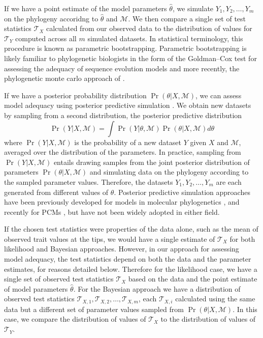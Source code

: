 \documentclass[a4paper,11pt]{article}
\begin{document}
If we have a point estimate of the model parameters $\hat{\theta}$, we simulate $Y_1, Y_2, \ldots, Y_m$ on the phylogeny accoridng to $\hat{\theta}$ and $\mathcal{M}$. We then compare a single set of test statistics $\mathcal{T}_X$ calculated from our observed data to the distribution of values for $\mathcal{T}_Y$ computed across all $m$ simulated datasets. In statistical terminology, this procedure is known as parametric bootstrapping. Parametric bootstrapping is likely familiar to phylogenetic biologists in the form of the Goldman--Cox test \citep{Goldman} for assessing the adequacy of sequence evolution models and more recently, the phylogenetic monte carlo approach of \citet{Boettiger2012}.

If we have a posterior probability distribution $\Pr(\theta|X, \mathcal{M})$, we can assess model adequacy using posterior predictive simulation \citep{Rubin1984, Gelman1996}. We obtain new datasets by sampling from a second distribution, the posterior predictive distribution
\begin{equation}
\Pr(Y|X,\mathcal{M}) = \int \Pr(Y|\theta, \mathcal{M})\Pr(\theta |X,\mathcal{M})d\theta
\end{equation}
where $\Pr(Y|X,\mathcal{M})$ is the probability of a new dataset $Y$ given $X$ and $\mathcal{M}$, averaged over the distribution of the parameters. In practice, sampling from $\Pr(Y|X,\mathcal{M})$ entails drawing samples from the joint posterior distribution of parameters $\Pr(\theta|X, \mathcal{M})$ and simulating data on the phylogeny according to the sampled parameter values. Therefore, the datasets $Y_1, Y_2, \ldots, Y_m$ are each generated from different values of $\theta$.  
Posterior predictive simulation approaches have been previously developed for models in molecular phylogenetics \citep{Bollback2002, Reid2013, Lewis2013, Brown2013}, and recently for PCMs \citep{SlaterPennell}, but have not been widely adopted in either field.

If the chosen test statistics were properties of the data alone, such as the mean of observed trait values at the tips, we would have a single estimate of $\mathcal{T}_X$ for both likelihood and Bayesian approaches. However, in our approach for assessing model adequacy, the test statistics depend on both the data and the parameter estimates, for reasons detailed below. Therefore for the likelihood case, we have a single set of observed test statistics $\mathcal{T}_X$ based on the data and the point estimate of model parameters $\hat{\theta}$. For the Bayesian approach we have a distribution of observed test statistics $\mathcal{T}_{X,1}, \mathcal{T}_{X,2}, \ldots, \mathcal{T}_{X,m}$, each $\mathcal{T}_{X,i}$ calculated using the same data but a different set of parameter values sampled from $\Pr(\theta|X, \mathcal{M})$. In this case, we compare the distribution of values of $\mathcal{T}_X$ to the distribution of values of $\mathcal{T}_Y$.
\end{document}
